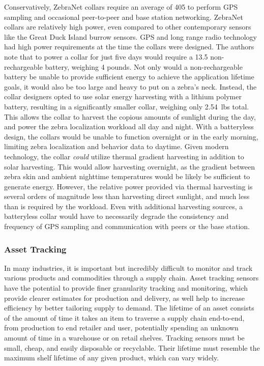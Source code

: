 Conservatively, ZebraNet collars require an average of 405\ssi{\milli\watt} to perform GPS sampling and occasional peer-to-peer and base station networking. ZebraNet collars are relatively high power, even compared to other contemporary sensors like the Great Duck Island burrow sensors.
GPS and long range radio technology had high power requirements at the time the collars were designed.
The authors note that to power a collar for just five days would require a 13.5\ssi{\ampere\hour} non-rechargeable battery, weighing 4 pounds. Not only would a non-rechargeable battery be unable to provide sufficient energy to achieve the application lifetime goals, it would also be too large and heavy to put on a zebra's neck.
Instead, the collar designers opted to use solar energy harvesting with a lithium polymer battery, resulting in a significantly smaller collar, weighing only 2.54~lbs total.
This allows the collar to harvest the copious amounts of sunlight during the day, and power the zebra localization workload all day and night.
With a batteryless design, the collars would be unable to function overnight or in the early morning, limiting zebra localization and behavior data to daytime.
Given modern technology, the collar \textit{could} utilize thermal gradient harvesting in addition to solar harvesting. This would allow harvesting overnight, as the gradient between zebra skin and ambient nighttime temperatures would be likely be sufficient to generate energy.
However, the relative power provided via thermal harvesting is several orders of magnitude less than harvesting direct sunlight, and much less than is required by the workload.
Even with additional harvesting sources, a batteryless collar would have to necessarily degrade the consistency and frequency of GPS sampling and communication with peers or the base station.

\subsubsection{Asset Tracking}
In many industries, it is important but incredibly difficult to monitor and track various products and commodities through a supply chain.
Asset tracking sensors have the potential to provide finer granularity tracking and monitoring, which provide clearer estimates for production and delivery, as well help to increase efficiency by better tailoring supply to demand.
The lifetime of an asset consists of the amount of time it takes an item to traverse a supply chain end-to-end, from production to end retailer and user, potentially spending an unknown amount of time in a warehouse or on retail shelves.
Tracking sensors must be small, cheap, and easily disposable or recyclable. Their lifetime must resemble the maximum shelf lifetime of any given product, which can vary widely.

